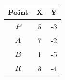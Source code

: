 \begin{tabular}[12pt]{ |c| c| c|}
    \hline
    \textbf{Point} & \textbf{X} & \textbf{Y}\\ 
    \hline
    $P$ & 5 & -3 \\
    \hline 
    $A$ & 7 & -2\\
    \hline
    $B$ & 1 & -5\\
    \hline
    $R$ & 3 & -4\\
    \hline   
    \end{tabular}
